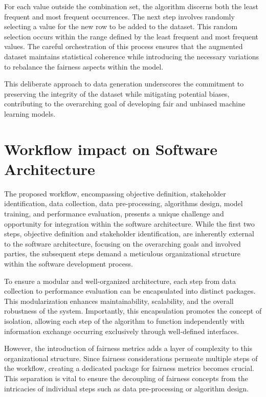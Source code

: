 

For each value outside the combination set, the algorithm discerns both the least frequent and most frequent occurrences. The next step involves randomly selecting a value for the new row to be added to the dataset. This random selection occurs within the range defined by the least frequent and most frequent values. The careful orchestration of this process ensures that the augmented dataset maintains statistical coherence while introducing the necessary variations to rebalance the fairness aspects within the model.

This deliberate approach to data generation underscores the commitment to preserving the integrity of the dataset while mitigating potential biases, contributing to the overarching goal of developing fair and unbiased machine learning models.

\section{Workflow impact on Software Architecture}

The proposed workflow, encompassing objective definition, stakeholder identification, data collection, data pre-processing, algorithms design, model training, and performance evaluation, presents a unique challenge and opportunity for integration within the software architecture. While the first two steps, objective definition and stakeholder identification, are inherently external to the software architecture, focusing on the overarching goals and involved parties, the subsequent steps demand a meticulous organizational structure within the software development process.

To ensure a modular and well-organized architecture, each step from data collection to performance evaluation can be encapsulated into distinct packages. This modularization enhances maintainability, scalability, and the overall robustness of the system. Importantly, this encapsulation promotes the concept of isolation, allowing each step of the algorithm to function independently with information exchange occurring exclusively through well-defined interfaces.

However, the introduction of fairness metrics adds a layer of complexity to this organizational structure. Since fairness considerations permeate multiple steps of the workflow, creating a dedicated package for fairness metrics becomes crucial. This separation is vital to ensure the decoupling of fairness concepts from the intricacies of individual steps such as data pre-processing or algorithm design.

